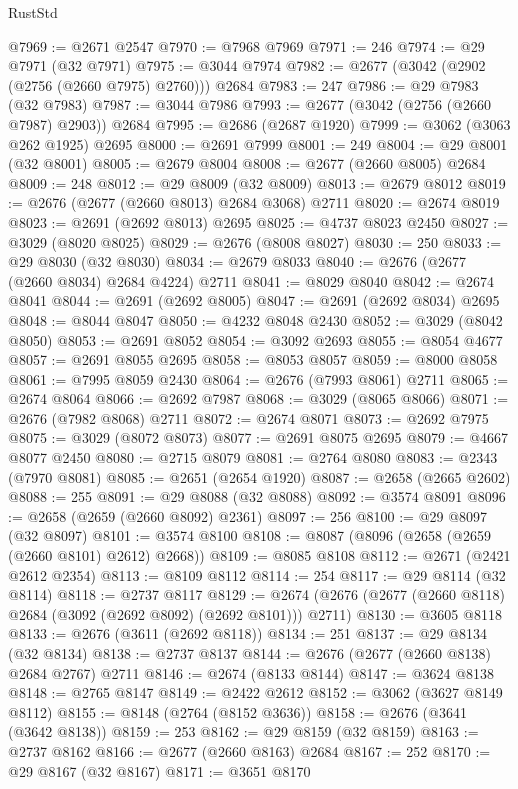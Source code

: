 \begin{lexlean}{RustStd}
\begin{coremodule}
{\begin{coremodule}
{{{{{{{{{{{{{{{{{{{{{{{{{{{{{{{{{{{{{{{{{{{{{{{{{{{{{{{@7969 := @2671 @2547
@7970 := @7968 @7969
@7971 := 246
@7974 := @29 @7971 (@32 @7971)
@7975 := @3044 @7974
@7982 := @2677 (@3042 (@2902 (@2756 (@2660 @7975) @2760))) @2684
@7983 := 247
@7986 := @29 @7983 (@32 @7983)
@7987 := @3044 @7986
@7993 := @2677 (@3042 (@2756 (@2660 @7987) @2903)) @2684
@7995 := @2686 (@2687 @1920)
@7999 := @3062 (@3063 @262 @1925) @2695
@8000 := @2691 @7999
@8001 := 249
@8004 := @29 @8001 (@32 @8001)
@8005 := @2679 @8004
@8008 := @2677 (@2660 @8005) @2684
@8009 := 248
@8012 := @29 @8009 (@32 @8009)
@8013 := @2679 @8012
@8019 := @2676 (@2677 (@2660 @8013) @2684 @3068) @2711
@8020 := @2674 @8019
@8023 := @2691 (@2692 @8013) @2695
@8025 := @4737 @8023 @2450
@8027 := @3029 (@8020 @8025)
@8029 := @2676 (@8008 @8027)
@8030 := 250
@8033 := @29 @8030 (@32 @8030)
@8034 := @2679 @8033
@8040 := @2676 (@2677 (@2660 @8034) @2684 @4224) @2711
@8041 := @8029 @8040
@8042 := @2674 @8041
@8044 := @2691 (@2692 @8005)
@8047 := @2691 (@2692 @8034) @2695
@8048 := @8044 @8047
@8050 := @4232 @8048 @2430
@8052 := @3029 (@8042 @8050)
@8053 := @2691 @8052
@8054 := @3092 @2693
@8055 := @8054 @4677
@8057 := @2691 @8055 @2695
@8058 := @8053 @8057
@8059 := @8000 @8058
@8061 := @7995 @8059 @2430
@8064 := @2676 (@7993 @8061) @2711
@8065 := @2674 @8064
@8066 := @2692 @7987
@8068 := @3029 (@8065 @8066)
@8071 := @2676 (@7982 @8068) @2711
@8072 := @2674 @8071
@8073 := @2692 @7975
@8075 := @3029 (@8072 @8073)
@8077 := @2691 @8075 @2695
@8079 := @4667 @8077 @2450
@8080 := @2715 @8079
@8081 := @2764 @8080
@8083 := @2343 (@7970 @8081)
@8085 := @2651 (@2654 @1920)
@8087 := @2658 (@2665 @2602)
@8088 := 255
@8091 := @29 @8088 (@32 @8088)
@8092 := @3574 @8091
@8096 := @2658 (@2659 (@2660 @8092) @2361)
@8097 := 256
@8100 := @29 @8097 (@32 @8097)
@8101 := @3574 @8100
@8108 := @8087 (@8096 (@2658 (@2659 (@2660 @8101) @2612) @2668))
@8109 := @8085 @8108
@8112 := @2671 (@2421 @2612 @2354)
@8113 := @8109 @8112
@8114 := 254
@8117 := @29 @8114 (@32 @8114)
@8118 := @2737 @8117
@8129 := @2674 (@2676 (@2677 (@2660 @8118) @2684 (@3092 (@2692 @8092) (@2692 @8101))) @2711)
@8130 := @3605 @8118
@8133 := @2676 (@3611 (@2692 @8118))
@8134 := 251
@8137 := @29 @8134 (@32 @8134)
@8138 := @2737 @8137
@8144 := @2676 (@2677 (@2660 @8138) @2684 @2767) @2711
@8146 := @2674 (@8133 @8144)
@8147 := @3624 @8138
@8148 := @2765 @8147
@8149 := @2422 @2612
@8152 := @3062 (@3627 @8149 @8112)
@8155 := @8148 (@2764 (@8152 @3636))
@8158 := @2676 (@3641 (@3642 @8138))
@8159 := 253
@8162 := @29 @8159 (@32 @8159)
@8163 := @2737 @8162
@8166 := @2677 (@2660 @8163) @2684
@8167 := 252
@8170 := @29 @8167 (@32 @8167)
@8171 := @3651 @8170
}}}}}}}}}}}}}}}}}}}}}}}}}}}}}}}}}}}}}}}}}}}}}}}}}}}}}}}
\end{coremodule}}
\end{coremodule}
\end{lexlean}
